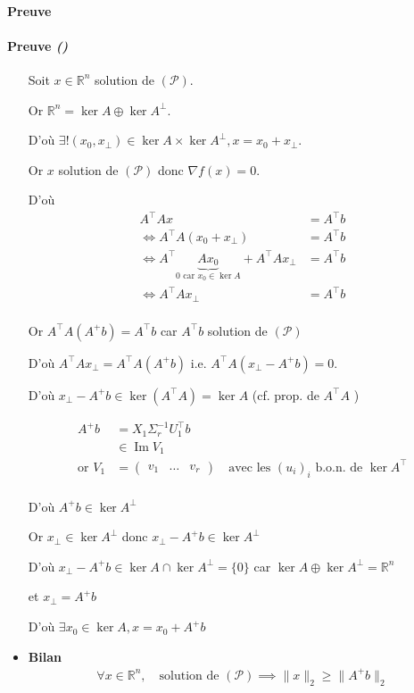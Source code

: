 \documentclass{article}
\newcommand{\img}{\operatorname{Im}}
\newcommand{\cP}{\mathcal{P}}
\newcommand{\R}{\mathbb{R}}
\newenvironment{proof}[1][\unskip]{
	\def\temp{#1}\ifx\temp\empty
		\paragraph{Preuve}
	\else
		\paragraph{Preuve \emph{(#1)}}
	\fi

}{}
\begin{document}
\begin{proof}
\begin{itemize}
            Soit $x\in \R^n$ solution de $(\cP)$.

            Or $\R^n = \ker A \oplus \ker A^\bot $.

            D'où $\exists ! (x_0, x_{\bot}) \in \ker A  \times \ker A^\bot, x = x_0 + x_{\bot} $.

            Or $x$ solution de $(\cP)$ donc $\nabla f(x)=0$.

            D'où 
            \begin{align*}
                A^\top  A x &= A^\top b\\
                \iff A^\top  A(x_0 + x_{\bot}) &= A^\top b \\
                \iff A^\top \underbrace{A x_0}_{\text{$0$ car $x_0\in \ker A$}} + A^\top  A x_{\bot} &= A^\top b \\
                \iff A^\top  A x_{\bot} &= A^\top b \\
            \end{align*}

            Or $A^\top  A (A^+ b) =A^\top b$ car $A^\top b$ solution de $(\cP)$ 

            D'où $A^\top  A x_{\bot} = A^\top  A(A^+b) \text{ i.e. } A^\top A(x_{\bot} - A^+ b) = 0$.

            D'où $x_{\bot}-A^+ b \in \ker(A^\top  A) = \ker A$ (cf. prop. de $A^\top A$ )

            \begin{align*}
                A^+ b &= X_1 \Sigma_r^{-1} U_1^\top b \\
                      &\in \img V_1 \\
                \text{or } V_1 &= \begin{pmatrix} v_1 & \ldots & v_r \end{pmatrix} \quad \text{avec les $(u_i)_i$ b.o.n. de $\ker A^\top $} \\
            \end{align*}

            D'où $A^+ b \in \ker A^\bot$

            Or $x_{\bot}\in \ker A^\bot$ donc $x_{\bot} - A^+ b \in \ker A^\bot$ 

            D'où $x_{\bot} - A^+ b \in \ker A \cap \ker A^\bot = \{0\} $ car $\ker A \oplus \ker A^\bot = \R^n$

            et $x_{\bot} = A^+ b$ 

            D'où $\exists x_0 \in \ker A, x=x_0 + A^+ b$ 

        \item {\bf Bilan} \begin{align*}
            \forall x \in \R^n,\quad \text{solution de $(\cP)$} \implies \|x\|_2 \ge \|A^{+}b\|_2
        \end{align*}

    \end{itemize}
\end{proof}
\end{document}
